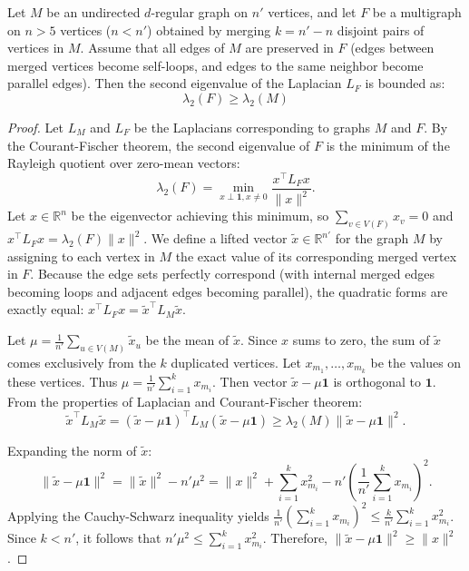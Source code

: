 \documentclass[10pt,a4paper]{amsart}
\begin{document}
\begin{lemma}\label{lem:vertex_merge}
Let $M$ be an undirected $d$-regular graph on $n'$ vertices, and let $F$ be a multigraph on $n>5$ vertices ($n < n'$) obtained by merging $k = n' - n$ disjoint pairs of vertices in $M$. Assume that all edges of $M$ are preserved in $F$ (edges between merged vertices become self-loops, and edges to the same neighbor become parallel edges). Then the second eigenvalue of the Laplacian $L_F$ is bounded as:
\begin{equation}
    \lambda_2(F) \geq \lambda_2(M)
\end{equation}
\end{lemma}

\begin{proof}
Let $L_M$ and $L_F$ be the Laplacians corresponding to graphs $M$ and $F$. By the Courant-Fischer theorem, the second eigenvalue of $F$ is the minimum of the Rayleigh quotient over zero-mean vectors:
\begin{equation}
    \lambda_2(F) = \min_{x \perp \mathbf{1}, x \neq 0} \frac{x^\top L_F x}{\|x\|^2}.
\end{equation}
Let $x \in \mathbb{R}^n$ be the eigenvector achieving this minimum, so $\sum_{v \in V(F)} x_v = 0$ and $x^\top L_F x = \lambda_2(F) \|x\|^2$.
We define a lifted vector $\tilde{x} \in \mathbb{R}^{n'}$ for the graph $M$ by assigning to each vertex in $M$ the exact value of its corresponding merged vertex in $F$. Because the edge sets perfectly correspond (with internal merged edges becoming loops and adjacent edges becoming parallel), the quadratic forms are exactly equal: $x^\top L_F x = \tilde{x}^\top L_M \tilde{x}$.

Let $\mu = \frac{1}{n'} \sum_{u \in V(M)} \tilde{x}_u$ be the mean of $\tilde{x}$.
Since $x$ sums to zero, the sum of $\tilde{x}$ comes exclusively from the $k$ duplicated vertices. Let $x_{m_1}, \ldots, x_{m_k}$ be the values on these vertices. Thus $\mu = \frac{1}{n'} \sum_{i=1}^k x_{m_i}$. Then vector $\tilde{x} - \mu \mathbf{1}$ is orthogonal to $\mathbf{1}$. From the properties of Laplacian and Courant-Fischer theorem:
\begin{equation}
    \tilde{x}^\top L_M \tilde{x} = (\tilde{x} - \mu \mathbf{1})^\top L_M (\tilde{x} - \mu \mathbf{1}) \ge \lambda_2(M) \|\tilde{x} - \mu\mathbf{1}\|^2.
\end{equation}

Expanding the norm of $\tilde{x}$:
\begin{equation}
    \|\tilde{x} - \mu\mathbf{1}\|^2 = \|\tilde{x}\|^2 - n'\mu^2 = \|x\|^2 + \sum_{i=1}^k x_{m_i}^2 - n'\left(\frac{1}{n'}\sum_{i=1}^k x_{m_i}\right)^2.
\end{equation}
Applying the Cauchy-Schwarz inequality yields $\frac{1}{n'}(\sum_{i=1}^k x_{m_i})^2 \leq \frac{k}{n'}\sum_{i=1}^k x_{m_i}^2$. Since $k < n'$, it follows that $n'\mu^2 \leq \sum_{i=1}^k x_{m_i}^2$. 
Therefore, $\|\tilde{x} - \mu\mathbf{1}\|^2 \geq \|x\|^2$. 


\end{proof}
\end{document}
